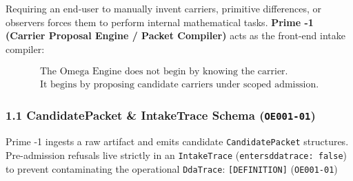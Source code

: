 \documentclass[
  11pt,
]{article}
\renewcommand{\_}{\origunderscore\allowbreak}
\begin{document}
Requiring an end-user to manually invent carriers, primitive
differences, or observers forces them to perform internal mathematical
tasks. \textbf{Prime -1 (Carrier Proposal Engine / Packet Compiler)}
acts as the front-end intake compiler:

\[\boxed{\begin{gathered}
\text{The Omega Engine does not begin by knowing the carrier.} \\
\text{It begins by proposing candidate carriers under scoped admission.}
\end{gathered}}\]

\subsubsection{\texorpdfstring{1.1 CandidatePacket \& IntakeTrace Schema
(\texttt{OE001-01})}{1.1 CandidatePacket \& IntakeTrace Schema (OE001-01)}}\label{candidatepacket-intaketrace-schema-oe001-01}

Prime -1 ingests a raw artifact and emits candidate
\texttt{CandidatePacket} structures. Pre-admission refusals live
strictly in an \texttt{IntakeTrace}
(\texttt{enters\_dda\_trace:\ false}) to prevent contaminating the
operational \texttt{DdaTrace}: \texttt{{[}DEFINITION{]}}
(\texttt{OE001-01})
\end{document}
